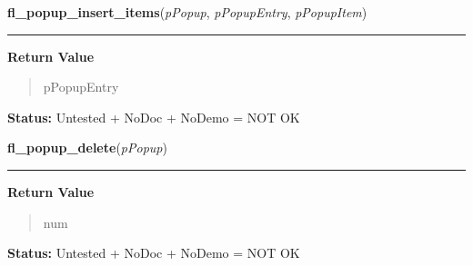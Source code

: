     \label{xformslib:library:fl_popup_insert_items}

    \vspace{0.5ex}

\hspace{.8\funcindent}\begin{boxedminipage}{\funcwidth}

    \raggedright \textbf{fl\_popup\_insert\_items}(\textit{pPopup}, \textit{pPopupEntry}, \textit{pPopupItem})

    \vspace{-1.5ex}

    \rule{\textwidth}{0.5\fboxrule}
\setlength{\parskip}{2ex}
\setlength{\parskip}{1ex}
      \textbf{Return Value}
    \vspace{-1ex}

      \begin{quote}
      pPopupEntry

      \end{quote}

\textbf{Status:} Untested + NoDoc + NoDemo = NOT OK



    \end{boxedminipage}

    \label{xformslib:library:fl_popup_delete}

    \vspace{0.5ex}

\hspace{.8\funcindent}\begin{boxedminipage}{\funcwidth}

    \raggedright \textbf{fl\_popup\_delete}(\textit{pPopup})

    \vspace{-1.5ex}

    \rule{\textwidth}{0.5\fboxrule}
\setlength{\parskip}{2ex}
\setlength{\parskip}{1ex}
      \textbf{Return Value}
    \vspace{-1ex}

      \begin{quote}
      num

      \end{quote}

\textbf{Status:} Untested + NoDoc + NoDemo = NOT OK



    \end{boxedminipage}


